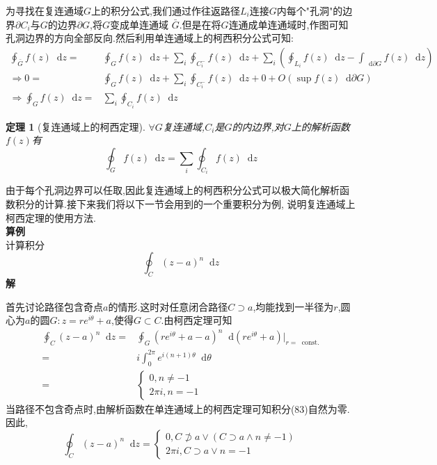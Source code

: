 \documentclass[UTF8]{ctexart}
\newcommand{\dif}{\mathop{}\!\mathrm{d}}
\newcommand{\const}{\mathop{}\!\mathrm{const.}}
\newtheorem{theorem}{定理}
\begin{document}
为寻找在复连通域$G$上的积分公式,我们通过作往返路径$L_{i}$连接$G$内每个"孔洞"的边界$\partial C_{i}$与$G$的边界$\partial G$,将$G$变成单连通域
$\bar{G}$.但是在将$G$连通成单连通域时,作图可知孔洞边界的方向全部反向.然后利用单连通域上的柯西积分公式可知:
\begin{align}
  \label{4}
  \oint_{\bar{G}}f(z)\dif z=&\oint_{G}f(z)\dif z+\sum_{i}\oint_{C^{-}_{i}}f(z)\dif z+\sum_{i}(\oint_{L_{i}}f(z)\dif z-\int_{\dif \partial G}f(z)\dif z) \\
  \Rightarrow 0=&\oint_{G}f(z)\dif z+\sum_{i}\oint_{C^{-}_{i}}f(z)\dif z+0+O(\sup f(z)\dif \partial G) \\
  \Rightarrow \oint_{G}f(z)\dif z=&\sum_{i}\oint_{C_{i}}f(z)\dif z
\end{align}
\begin{theorem}[复连通域上的柯西定理]
  $\forall G$复连通域,$C_{i}$是$G$的内边界,对$G$上的解析函数$f(z)$有
  \begin{equation}
    \oint_{G}f(z)\dif z=\sum_{i}\oint_{C_{i}}f(z)\dif z
  \end{equation}
\end{theorem}
由于每个孔洞边界可以任取,因此复连通域上的柯西积分公式可以极大简化解析函数积分的计算.接下来我们将以下一节会用到的一个重要积分为例,
说明复连通域上柯西定理的使用方法. \\
\textbf{算例} \\
计算积分
\begin{equation}
  \oint_{C}(z-a)^{n}\dif z
\end{equation}
\textbf{解}

首先讨论路径包含奇点$a$的情形.这时对任意闭合路径$C\supset a$,均能找到一半径为$r$,圆心为$a$的圆$G:z=re^{i\theta}+a$,使得$G\subset C$.由柯西定理可知
\begin{align}
  \label{3}
  \oint_{C}(z-a)^{n}\dif z=&\oint_{G}(re^{i\theta}+a-a)^{n}\dif (re^{i\theta}+a)|_{r=\const}\\
  =&i\int_{0}^{2\pi}e^{i(n+1)\theta}\dif\theta \\
  =&\begin{cases}
    0,n\not= -1 \\
    2\pi i,n=-1
  \end{cases}
\end{align}
当路径不包含奇点时,由解析函数在单连通域上的柯西定理可知积分(83)自然为零.因此,
\begin{equation}
  \oint_{C}(z-a)^{n}\dif z=\begin{cases}
    0,C\not\supset a\vee (C\supset a \wedge n\not=-1) \\
    2\pi i,C\supset a \vee n=-1
  \end{cases}
\end{equation}
\end{document}
